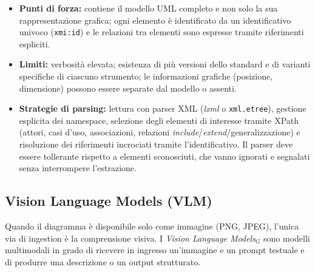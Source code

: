 \documentclass[a4paper, 11pt]{article}
\newcommand{\term}[1]{\textit{#1}$_G$} %
\begin{document}
\begin{itemize}
    \item \textbf{Punti di forza:} contiene il modello UML completo e non solo la sua rappresentazione grafica; ogni elemento è identificato da un identificativo univoco (\texttt{xmi:id}) e le relazioni tra elementi sono espresse tramite riferimenti espliciti.
    \item \textbf{Limiti:} verbosità elevata; esistenza di più versioni dello standard e di varianti specifiche di ciascuno strumento; le informazioni grafiche (posizione, dimensione) possono essere separate dal modello o assenti.
    \item \textbf{Strategie di parsing:} lettura con parser XML (\textit{lxml} o \texttt{xml.etree}), gestione esplicita dei namespace, selezione degli elementi di interesse tramite XPath (attori, casi d'uso, associazioni, relazioni \textit{include}/\textit{extend}/generalizzazione) e risoluzione dei riferimenti incrociati tramite l'identificativo. Il parser deve essere tollerante rispetto a elementi sconosciuti, che vanno ignorati e segnalati senza interrompere l'estrazione.
\end{itemize}

\subsection{Vision Language Models (VLM)}
Quando il diagramma è disponibile solo come immagine (PNG, JPEG), l'unica via di ingestion è la comprensione visiva. I \term{Vision Language Models} sono modelli multimodali in grado di ricevere in ingresso un'immagine e un prompt testuale e di produrre una descrizione o un output strutturato.
\end{document}
